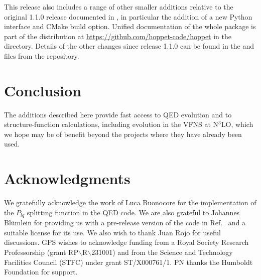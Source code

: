 \documentclass[preprint,1p,a4paper,11pt]{elsarticle}
\begin{document}
This release also includes a range of other smaller additions relative
to the original 1.1.0 release documented in \cite{Salam:2008qg}, in
particular the addition of a new Python interface and CMake build
option.
%
Unified documentation of the whole \hoppet package is part of the
distribution at \url{https://github.com/hoppet-code/hoppet} in the
 directory.
%
Details of the other changes since release 1.1.0 can be found in the
 and  files from the
repository.\medskip

\noindent {}



\section{Conclusion}

The \hoppet additions described here provide fast access to QED
evolution and to structure-function calculations, including evolution
in the VFNS at N$^3$LO, which we hope may be of benefit beyond the
projects where they have already been used.


\section*{Acknowledgments}


We gratefully acknowledge the work of Luca Buonocore
for the implementation of the $P_{lq}$ splitting function in the QED code.
%
We are also grateful to Johannes Bl\"umlein for providing us with a
pre-release version of the code in Ref.~\cite{BlumleinCode} and a
suitable license for its use.
%
We also wish to thank Juan Rojo for useful discussions. 
%
GPS wishes to acknowledge funding from a Royal Society Research
Professorship (grant RP$\backslash$R$\backslash$231001) and from the Science and
Technology Facilities Council (STFC) under grant ST/X000761/1.
%
PN thanks the Humboldt Foundation for support. 
%
\appendix





%
\end{document}
